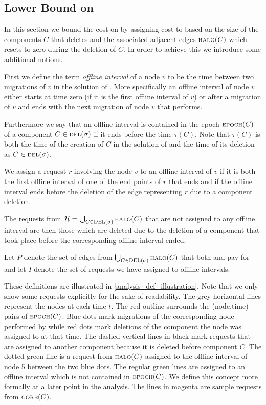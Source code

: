 \documentclass[a4paper, 10pt]{article}
\newcommand{\crep}{\text{C{\scriptsize REP}}}
\newcommand{\del}{\text{\scriptsize DEL}}
\newcommand{\opt}{\text{O{\scriptsize PT}}}
\newcommand{\core}{\text{\scriptsize CORE}}
\newcommand{\halo}{\text{\scriptsize HALO}}
\newcommand{\epoch}{\text{\scriptsize EPOCH}}
\theoremstyle{definition}
\begin{document}
\subsection{Lower Bound on \opt{}}

In this section we bound the cost on \opt{} by assigning cost to \opt{} based on the size of the components $C$ that \crep{} deletes and the associated adjacent edges $\halo(C)$ which \crep{} resets to zero during the deletion of $C$. In order to achieve this we introduce some additional notions.

First we define the term \textit{offline interval} of a node $v$ to be the time between two migrations of $v$ in the solution of \opt{}. More specifically an offline interval of node $v$ either starts at time zero (if it is the first offline interval of $v$) or after a migration of $v$ and ends with the next migration of node $v$ that \opt{} performs.

Furthermore we say that an offline interval is contained in the epoch $\epoch(C)$ of a component $C\in\del{}(\sigma)$ if it ends before the time $\tau(C)$. Note that $\tau(C)$ is both the time of the creation of $C$ in the solution of \crep{} and the time of its deletion as $C\in\del{}(\sigma)$.

We assign a request $r$ involving the node $v$ to an offline interval of $v$ if it is both the first offline interval of one of the end points of $r$ that ends and if the offline interval ends before the deletion of the edge representing $r$ due to a component deletion.

The requests from $\mathcal{H}=\bigcup_{C\in\del{}(\sigma)}\halo{}(C)$ that are not assigned to any offline interval are then those which are deleted due to the deletion of a component that took place before the corresponding offline interval ended.

Let $P$ denote the set of edges from $\bigcup_{C\in\del{}(\sigma)}\halo{}(C)$ that both \crep{} and \opt{} pay for and let $I$ denote the set of requests we have assigned to offline intervals.

These definitions are illustrated in \cref{analysis_def_illustration}. Note that we only show some requests explicitly for the sake of readability. The grey horizontal lines represent the nodes at each time $t$. The red outline surrounds the (node,time) pairs of $\epoch(C)$. Blue dots mark migrations of the corresponding node performed by \opt{} while red dots mark deletions of the component the node was assigned to at that time. The dashed vertical lines in black mark requests that are assigned to another component because it is deleted before component $C$. The dotted green line is a request from $\halo(C)$ assigned to the offline interval of node 5 between the two blue dots. The regular green lines are assigned to an offline interval which is not contained in $\epoch(C)$. We define this concept more formally at a later point in the analysis. The lines in magenta are sample requests from $\core(C)$.
\end{document}
